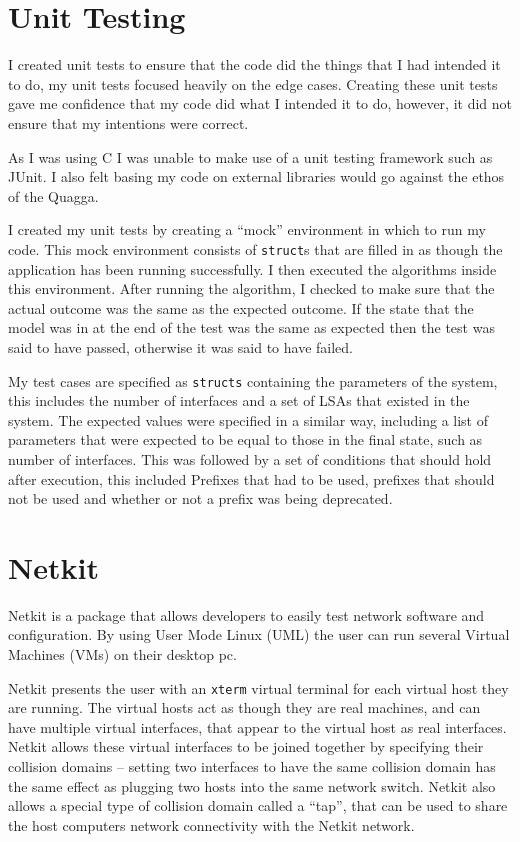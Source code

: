 \documentclass[12pt]{report}
\begin{document}
\section{Unit Testing}
I created unit tests to ensure that the code did the things that I had intended
it to do, my unit tests focused heavily on the edge cases. Creating these unit
tests gave me confidence that my code did what I intended it to do, however, it
did not ensure that my intentions were correct. 

As I was using C I was unable to make use of a unit testing framework such as
JUnit. I also felt basing my code on external libraries would go against
the ethos of the Quagga.

I created my unit tests by creating a ``mock'' environment in which to run my
code. This mock environment consists of \texttt{struct}s that are filled in as
though the application has been running successfully.  I then executed the
algorithms inside this environment. After running the algorithm, I checked to
make sure that the actual outcome was the same as the expected outcome. If the
state that the model was in at the end of the test was the same as expected
then the test was said to have passed, otherwise it was said to have failed. 

My test cases are specified as \texttt{structs} containing the parameters of
the system, this includes the number of interfaces and a set of LSAs that
existed in the system. The expected values were specified in a similar way,
including a list of parameters that were expected to be equal to those in the
final state, such as number of interfaces. This was followed by a set of
conditions that should hold after execution, this included Prefixes that had to
be used, prefixes that should not be used and whether or not a prefix was being
deprecated. 

\section{Netkit} 
Netkit is a package that allows developers to easily test network software and
configuration. By using User Mode Linux (UML)  the user can run several Virtual Machines (VMs)
 on their desktop pc. 

Netkit presents the user with an \texttt{xterm} virtual terminal for each
virtual host they are running. The virtual hosts act as though they are real
machines, and can have multiple virtual interfaces, that appear to the virtual
host as real interfaces. Netkit allows these virtual interfaces to be joined
together by specifying their collision domains -- setting two interfaces to have
the same collision domain has the same effect as plugging two hosts into the
same network switch. Netkit also allows a special type of collision domain
called a ``tap'', that can be used to share the host computers network
connectivity with the Netkit network.
\end{document}
